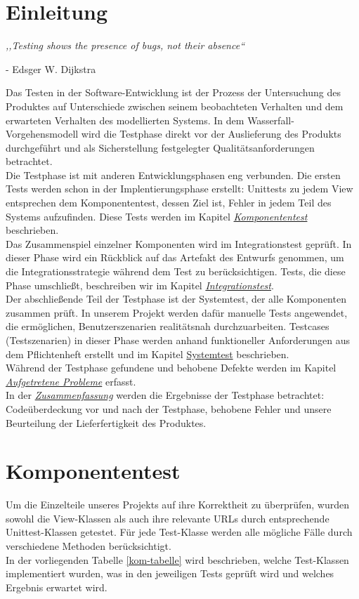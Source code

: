 \documentclass[parskip=full,11pt]{scrartcl}
\begin{document}
 \section{Einleitung}
\begin{center}
\textit{,,Testing shows the presence of bugs, not their absence``}
\end{center}
\begin{flushright}
- Edsger W. Dijkstra\\
\end{flushright}
Das Testen in der Software-Entwicklung ist der Prozess der Untersuchung des Produktes auf Unterschiede zwischen seinem beobachteten Verhalten und dem erwarteten Verhalten des modellierten Systems.
In dem Wasserfall-Vorgehensmodell wird die Testphase direkt vor der Auslieferung des Produkts durchgeführt und als Sicherstellung festgelegter Qualitätsanforderungen betrachtet.\\
Die Testphase ist mit anderen Entwicklungsphasen eng verbunden. Die ersten Tests werden schon in der Implentierungsphase erstellt: Unittests zu jedem View entsprechen dem Komponententest, dessen Ziel ist, Fehler in jedem Teil des Systems aufzufinden. Diese Tests werden im Kapitel \hyperref[komponententest]{\textit{Komponententest}} beschrieben.\\
Das Zusammenspiel einzelner Komponenten wird im Integrationstest geprüft. In dieser Phase wird ein Rückblick auf das Artefakt des Entwurfs genommen, um die Integrationsstrategie während dem Test zu berücksichtigen. Tests, die diese Phase umschlie{\ss}t, beschreiben wir im Kapitel \hyperref[integrationtest]{\textit{Integrationstest}}.\\
Der abschlie{\ss}ende Teil der Testphase ist der Systemtest, der alle Komponenten zusammen prüft. In unserem Projekt werden dafür manuelle Tests angewendet, die ermöglichen, Benutzerszenarien realitätsnah durchzuarbeiten. Testcases (Testszenarien) in dieser Phase werden anhand funktioneller Anforderungen aus dem Pflichtenheft erstellt und im Kapitel \hyperref[systemtest]{Systemtest} beschrieben.\\
Während der Testphase gefundene und behobene  Defekte werden im Kapitel \hyperref[bugs]{\textit{Aufgetretene Probleme}} erfasst.\\
In der \hyperref[zusammenfassung]{\textit{Zusammenfassung}} werden die Ergebnisse der Testphase betrachtet: Codeüberdeckung vor und nach der Testphase, behobene Fehler und unsere Beurteilung der Lieferfertigkeit des Produktes.
 \newpage
\section{Komponententest} \label{komponententest}
Um die Einzelteile unseres Projekts auf ihre Korrektheit zu überprüfen, wurden sowohl die View-Klassen als auch ihre relevante URLs durch entsprechende Unittest-Klassen getestet. Für jede Test-Klasse werden alle mögliche Fälle durch verschiedene Methoden berücksichtigt.\\
In der vorliegenden Tabelle \ref{kom-tabelle} wird beschrieben, welche Test-Klassen implementiert wurden, was in den jeweiligen Tests geprüft wird und welches Ergebnis erwartet wird.
\end{document}
